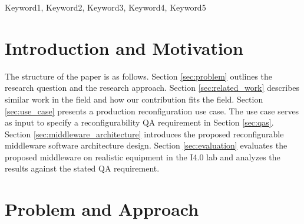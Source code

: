 \documentclass[conference]{IEEEtran}
\begin{document}



\maketitle
\IEEEpubidadjcol
\begin{abstract}

    



\end{abstract}

\begin{IEEEkeywords}
Keyword1, Keyword2, Keyword3, Keyword4, Keyword5
\end{IEEEkeywords}

\section{Introduction and Motivation}






The structure of the paper is as follows. 
Section \ref{sec:problem} outlines the research question and the research approach. 
Section \ref{sec:related_work} describes similar work in the field and how our contribution fits the field.
Section \ref{sec:use_case} presents a production reconfiguration use case.
The use case serves as input to specify a reconfigurability QA requirement in Section \ref{sec:qas}.
Section \ref{sec:middleware_architecture} introduces the proposed reconfigurable middleware software architecture design.
Section \ref{sec:evaluation} evaluates the proposed middleware on realistic equipment in the I4.0 lab and analyzes the results against the stated QA requirement.   

\section{Problem and Approach}
\end{document}
